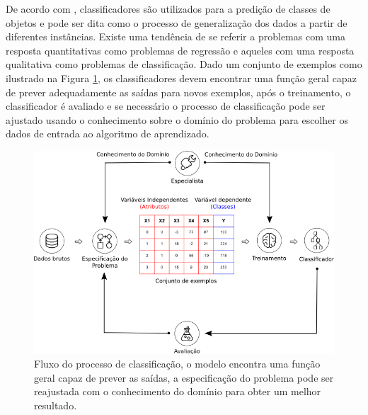 De acordo com \cite{porthos_motta:2016}, classificadores são utilizados para a 
predição de classes de objetos e pode ser dita como o processo de generalização 
dos dados a partir de diferentes instâncias. Existe uma tendência de se referir 
a problemas com uma resposta quantitativas como problemas de regressão e 
aqueles com uma resposta qualitativa como problemas de classificação. Dado um 
conjunto de exemplos como ilustrado na Figura 
\ref{figure:processo_classificacao}, os classificadores devem encontrar uma 
função geral capaz de prever adequadamente as saídas para novos exemplos, após 
o treinamento, o classificador é avaliado e se necessário o processo de 
classificação pode ser ajustado usando o conhecimento sobre o domínio do 
problema para escolher os dados de entrada ao algoritmo de aprendizado.

\begin{figure}[H]
\begin{center}
    \includegraphics[scale=0.60]{images/processo_classificacao.png}
\end{center}
\caption{Fluxo do processo de classificação, o modelo encontra uma função geral 
capaz de prever as saídas, a especificação do problema pode ser reajustada com 
o conhecimento do domínio para obter um melhor resultado.}
\label{figure:processo_classificacao}
\end{figure}

